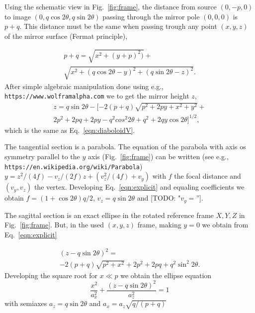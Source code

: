\documentclass{iucr}              %
\newcommand{\todo}[1]{{\color{red}[TODO: "#1'']}}
\begin{document}
Using the schematic view in Fig.~\ref{fig:frame}, the distance from source $(0,-p,0)$ to image $(0,q \cos2\theta, q \sin2\theta)$ passing through the mirror pole $(0,0,0)$ is $p+q$. This distance must be the same when passing trough any point $(x,y,z)$ of the mirror surface (Fermat principle),

\begin{multline}
\label{eqn:distances}
p + q = 
\sqrt{x^2 + (y + p)^2)} + \\
\sqrt{x^2 + (q \cos2 \theta - y)^2 + (q \sin2 \theta - z)^2}.
\end{multline}
After simple algebraic manipulation done using e.g., {\tt https://www.wolframalpha.com} we to get the mirror height $z$,
\begin{multline}
\label{eqn:explicit}
z = q \sin2\theta - 
[-2 (p + q) \sqrt{p^2 + 2 p y + x^2 + y^2} + \\ 
2 p^2 +2  p q +  2 p y - q^2 cos^2 2 \theta +  q^2 + 2 q y \cos2\theta ]^{1/2},
\end{multline}
which is the same as Eq.~\ref{eqn:diaboloidV}. 

The tangential section is a parabola. The equation of the parabola with axis os symmetry parallel to the $y$ axis (Fig.~\ref{fig:frame}) can be written (see e.g., {\tt https://en.wikipedia.org/wiki/Parabola}) $y = z^2/(4 f) - v_z/(2 f) z + (v_z^2/(4 f)+ v_y)$ with $f$ the focal distance and $(v_y,v_z)$ the vertex. Developing Eq.~\ref{eqn:explicit} and equaling coefficients we obtain $f=(1+\cos2\theta)q/2$, $v_z=q \sin2\theta$ and \todo{$v_y=$}.

The sagittal section is an exact ellipse in the rotated reference frame $X,Y,Z$ in Fig.~\ref{fig:frame}. But, in the used $(x,y,z)$ frame, making $y=0$ we obtain from Eq.~\ref{eqn:explicit}

\begin{multline}
\label{eqn:explicit}
(z - q \sin2\theta)^2 = \\
-2 (p + q) \sqrt{p^2 + x^2}+ 
2 p^2 +2  p q + q^2 \sin^2 2 \theta.
\end{multline}
Developing the square root for $x\ll p$ we obtain the ellipse equation
\begin{equation}
\label{eqn:ellipse}
\frac{x^2}{a_x^2} + \frac{(z-q \sin2\theta)^2}{a_z^2}=1
\end{equation}
with semiaxes $a_z=q \sin2\theta$ and $a_x=a_z\sqrt{q/(p+q)}$
\end{document}
